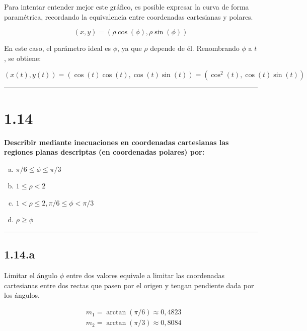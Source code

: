 \documentclass{article}
\begin{document}
Para intentar entender mejor este gráfico, es posible expresar la curva de forma paramétrica, recordando la equivalencia entre coordenadas cartesianas y polares.

\begin{equation}
(x, y) = (\rho \cos(\phi), \rho \sin(\phi))
\end{equation}

En este caso, el parámetro ideal es $\phi$, ya que $\rho$ depende de él. Renombrando $\phi$ a $t$, se obtiene:

\begin{equation}
(x(t), y(t)) = (\cos(t) \cos(t), \cos(t)\sin(t)) = (\cos^2(t), \cos(t) \sin(t))
\end{equation}

\hrule
\vspace{10 pt}

\section*{1.14}
\label{sec:1.14}

\textbf{Describir mediante inecuaciones en coordenadas cartesianas las regiones planas descriptas (en coordenadas polares) por:}

\begin{enumerate}[(a)]
\bfseries
\item $\pi/6 \leq \phi \leq \pi/3$

\item $1 \leq \rho < 2$

\item $1 < \rho \leq 2, \pi/6 \leq \phi < \pi/3$

\item $\rho \geq \phi$
\end{enumerate}
\hrule

\subsection*{1.14.a}
\label{subsec:1.14.a}

Limitar el ángulo $\phi$ entre dos valores equivale a limitar las coordenadas cartesianas entre dos rectas que pasen por el origen y tengan pendiente dada por los ángulos.

\begin{subequations}
\begin{align}
& m_1 = \arctan(\pi/6) \approx 0,4823 \\
& m_2 = \arctan(\pi/3) \approx 0,8084
\end{align}
\end{subequations}
\end{document}
